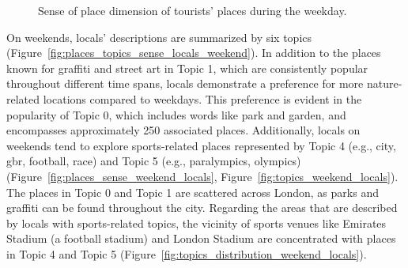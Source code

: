 \documentclass{article}
\theoremstyle{remark}
\begin{document}
\begin{figure}[!h]
    \caption{Sense of place dimension of tourists' places during the weekday.}
    \label{fig:places_topics_sense_tourists_weekday}
\end{figure}

On weekends, locals' descriptions are summarized by six topics (Figure~\ref{fig:places_topics_sense_locals_weekend}). 
In addition to the places known for graffiti and street art in Topic 1, which are consistently popular throughout different time spans, locals demonstrate a preference for more nature-related locations compared to weekdays. This preference is evident in the popularity of Topic 0, which includes words like park and garden, and encompasses approximately 250 associated places. Additionally, locals on weekends tend to explore sports-related places represented by Topic 4 (e.g., city, gbr, football, race) and Topic 5 (e.g., paralympics, olympics) (Figure~\ref{fig:places_sense_weekend_locals}, Figure~\ref{fig:topics_weekend_locals}). The places in Topic 0 and Topic 1 are scattered across London, as parks and graffiti can be found throughout the city. Regarding the areas that are described by locals with sports-related topics, the vicinity of sports venues like Emirates Stadium (a football stadium) and London Stadium are concentrated with places in Topic 4 and Topic 5 (Figure~\ref{fig:topics_distribution_weekend_locals}).
\end{document}
